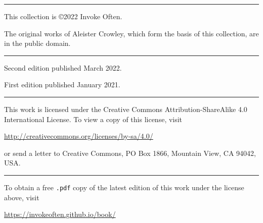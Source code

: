 {
\vspace*{\fill}
\begin{center}
  \rule{1in}{0.5pt}
\end{center}

This collection is \copyright 2022 Invoke Often.

\vspace{\baselineskip}

The original works of Aleister Crowley, which form the basis of this collection, are in the public domain.

\begin{center}
  \rule{1in}{0.5pt}
\end{center}

Second edition published March 2022.

\vspace{\baselineskip}

First edition published January 2021.

\begin{center}
  \rule{1in}{0.5pt}
\end{center}

\begin{center}
\end{center}

This work is licensed under the Creative Commons Attribution-ShareAlike 4.0 International License. To view a copy of this license, visit

\begin{center} \url{http://creativecommons.org/licenses/by-sa/4.0/} \end{center}

or send a letter to Creative Commons, PO Box 1866, Mountain View, CA 94042, USA.

\begin{center}
  \rule{1in}{0.5pt}
\end{center}

To obtain a free \texttt{.pdf} copy of the latest edition of this work under the license above, visit

\begin{center}\url{https://invokeoften.github.io/book/}\end{center}

}
